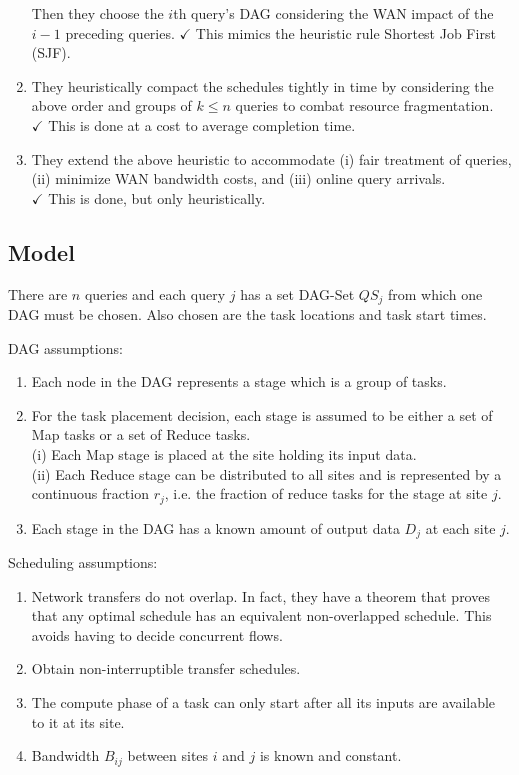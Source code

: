 \begin{enumerate}
	Then they choose the $i$th query's DAG considering the WAN impact of the $i-1$ preceding queries.
	$\checkmark$ This mimics the heuristic rule Shortest Job First (SJF).
	\item They heuristically compact the schedules tightly in time by considering the above order and groups of $k\leq n$ queries to combat resource fragmentation. \\
	$\checkmark$ This is done at a cost to average completion time.
	\item They extend the above heuristic to accommodate (i) fair treatment of queries, (ii) minimize WAN bandwidth costs, and (iii) online query arrivals. \\
	$\checkmark$ This is done, but only heuristically.
\end{enumerate}

\subsection{Model}
There are $n$ queries and each query $j$ has a set DAG-Set $QS_j$ from which one DAG must be chosen.
Also chosen are the task locations and task start times.

DAG assumptions:
\begin{enumerate}
	\item Each node in the DAG represents a stage which is a group of tasks.
	\item For the task placement decision, each stage is assumed to be either a set of Map tasks or a set of Reduce tasks.
	 \\
	(i) Each Map stage is placed at the site holding its input data. \\
	(ii) Each Reduce stage can be distributed to all sites and is represented by a continuous fraction $r_j$, i.e. the fraction of reduce tasks for the stage at site $j$.
	\item Each stage in the DAG has a known amount of output data $D_j$ at each site $j$.
\end{enumerate}

Scheduling assumptions:
\begin{enumerate}
	\item Network transfers do not overlap.
	In fact, they have a theorem that proves that any optimal schedule has an equivalent non-overlapped schedule.
	This avoids having to decide concurrent flows.
	\item Obtain non-interruptible transfer schedules.
	\item The compute phase of a task can only start after all its inputs are available to it at its site.
	\item Bandwidth $B_{ij}$ between sites $i$ and $j$ is known and constant.
\end{enumerate}

